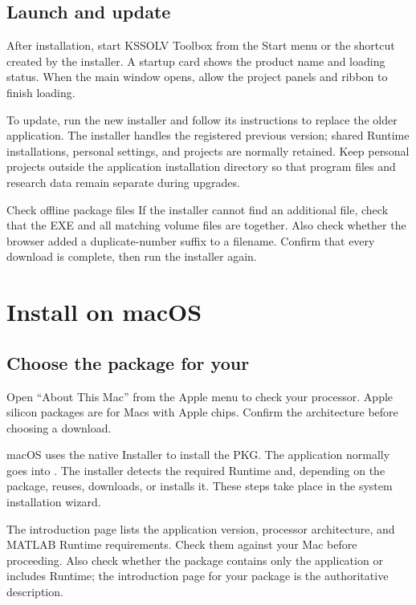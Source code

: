 \subsection{Launch and update}

After installation, start KSSOLV Toolbox from the Start menu or the shortcut created by the installer. A startup card shows the product name and loading status. When the main window opens, allow the project panels and ribbon to finish loading.

To update, run the new installer and follow its instructions to replace the older application. The installer handles the registered previous version; shared Runtime installations, personal settings, and projects are normally retained. Keep personal projects outside the application installation directory so that program files and research data remain separate during upgrades.

\begin{notebox}{Check offline package files}
If the installer cannot find an additional file, check that the EXE and all matching volume files are together. Also check whether the browser added a duplicate-number suffix to a filename. Confirm that every download is complete, then run the installer again.
\end{notebox}

\section{Install on macOS}

\subsection{Choose the package for your }

Open ``About This Mac'' from the Apple menu to check your processor. Apple silicon packages are for Macs with Apple chips. Confirm the architecture before choosing a download.

macOS uses the native Installer to install the PKG. The application normally goes into . The installer detects the required Runtime and, depending on the package, reuses, downloads, or installs it. These steps take place in the system installation wizard.

The introduction page lists the application version, processor architecture, and MATLAB\regmark{} Runtime requirements. Check them against your Mac before proceeding. Also check whether the package contains only the application or includes Runtime; the introduction page for your package is the authoritative description.

